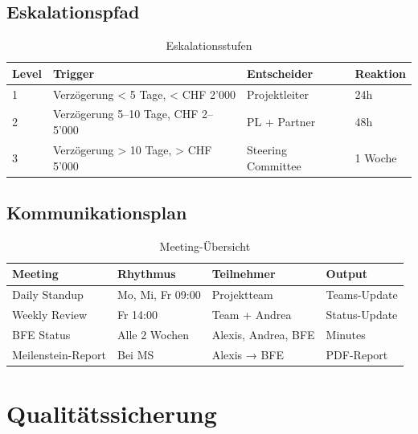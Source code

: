 \documentclass[11pt,a4paper]{article}
\begin{document}
\subsection{Eskalationspfad}

\begin{table}[h]
\centering
{}
\begin{tabular}{C{1.5cm}L{4.5cm}L{4cm}C{2cm}}
\toprule
\textbf{Level} & \textbf{Trigger} & \textbf{Entscheider} & \textbf{Reaktion} \\
 & Verzögerung < 5 Tage, < CHF 2'000 & Projektleiter & 24h \\
2 & Verzögerung 5--10 Tage, CHF 2--5'000 & PL + Partner & 48h \\
3 & Verzögerung > 10 Tage, > CHF 5'000 & Steering Committee & 1 Woche \\
\bottomrule
\end{tabular}
\caption{Eskalationsstufen}
\end{table}

\subsection{Kommunikationsplan}

\begin{table}[h]
\centering
{}
\begin{tabular}{L{4cm}L{3cm}L{3.5cm}L{2.5cm}}
\toprule
\textbf{Meeting} & \textbf{Rhythmus} & \textbf{Teilnehmer} & \textbf{Output} \\
\midrule
Daily Standup & Mo, Mi, Fr 09:00 & Projektteam & Teams-Update \\
Weekly Review & Fr 14:00 & Team + Andrea & Status-Update \\
BFE Status & Alle 2 Wochen & Alexis, Andrea, BFE & Minutes \\
Meilenstein-Report & Bei MS & Alexis → BFE & PDF-Report \\
\bottomrule
\end{tabular}
\caption{Meeting-Übersicht}
\end{table}

\newpage

\section{Qualitätssicherung}
\end{document}
